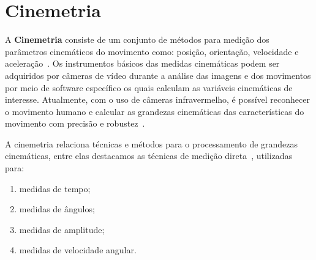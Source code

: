 \section{Cinemetria}
A \textbf{Cinemetria} consiste de um conjunto de métodos para medição dos parâmetros cinemáticos do movimento como: posição, orientação, velocidade e aceleração~\cite{biomecanica99}. Os instrumentos básicos das medidas cinemáticas podem ser adquiridos por câmeras de vídeo durante a análise das imagens e dos movimentos por meio de software específico os quais calculam as variáveis cinemáticas de interesse. Atualmente, com o uso de câmeras infravermelho, é possível reconhecer o movimento humano e calcular as grandezas cinemáticas das características do movimento com precisão e robustez~\cite{gabel2012}.

A cinemetria relaciona técnicas e métodos para o processamento de grandezas cinemáticas, entre elas destacamos as técnicas de medição direta~\cite{biomecanica99}, utilizadas para: 
\begin{enumerate}
	\item medidas de tempo;
	\item medidas de ângulos;
	\item medidas de amplitude;
	\item medidas de velocidade angular.
\end{enumerate}

% 


